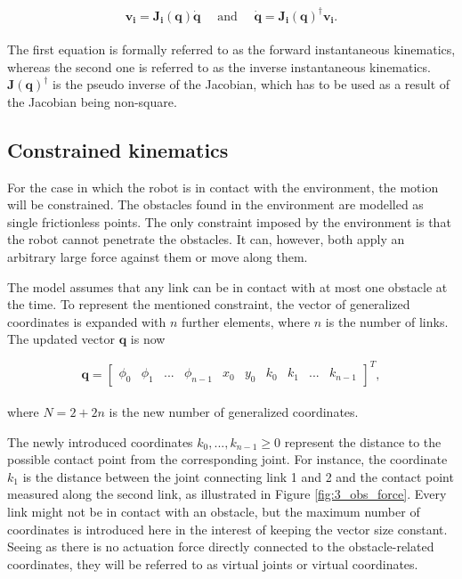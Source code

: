 \begin{equation}
    \mathbf{v_i = J_i(q) \dot{q}} \quad \textrm{ and } \quad \mathbf{\dot{q} = J_i(q)^\dagger v_i}.
\end{equation}
\\
The first equation is formally referred to as the forward instantaneous kinematics, whereas the second one is referred to as the inverse instantaneous kinematics.
$\mathbf{J(q)^\dagger}$ is the pseudo inverse of the Jacobian, which has to be used as a result of the Jacobian being non-square.


\subsection{Constrained kinematics}\label{seq:constr_kin}

For the case in which the robot is in contact with the environment, the motion will be constrained. The obstacles found in the environment are modelled as single frictionless points. The only constraint imposed by the environment is that the robot cannot penetrate the obstacles. It can, however, both apply an arbitrary large force against them or move along them.

The model assumes that any link can be in contact with at most one obstacle at the time. To represent the mentioned constraint, the vector of generalized coordinates is expanded with $n$ further elements, where $n$ is the number of links. The updated vector $\mathbf{q}$ is now

\begin{equation} \label{eq:q2}
    \mathbf{q} = 
    \begin{bmatrix}
        \phi_0 & \phi_1 & ... & \phi_{n-1} & x_0 & y_0 & k_{0} & k_{1} & ... & k_{n-1}
    \end{bmatrix}^T,
\end{equation}
\\
where $N = 2 + 2n$ is the new number of generalized coordinates.

The newly introduced coordinates $k_{0}, ... , k_{n-1} \geq 0$ represent the distance to the possible contact point from the corresponding joint. For instance, the coordinate $k_{1}$ is the distance between the joint connecting link 1 and 2 and the contact point measured along the second link, as illustrated in Figure \ref{fig:3_obs_force}. Every link might not be in contact with an obstacle, but the maximum number of coordinates is introduced here in the interest of keeping the vector size constant. 
Seeing as there is no actuation force directly connected to the obstacle-related coordinates, they will be referred to as virtual joints or virtual coordinates.

